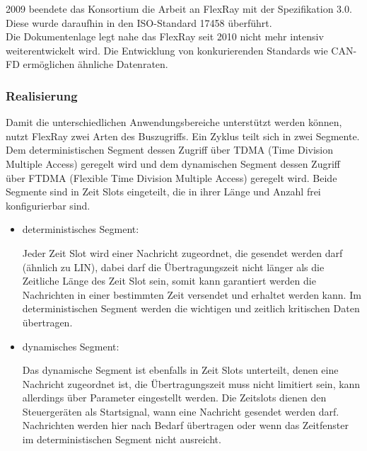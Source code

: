     2009 beendete das Konsortium die Arbeit an FlexRay mit der Spezifikation 3.0. Diese wurde
    daraufhin in den ISO-Standard 17458 überführt.\\
    Die Dokumentenlage legt nahe das FlexRay seit 2010 nicht mehr intensiv weiterentwickelt 
    wird. 
    Die Entwicklung von konkurierenden Standards wie CAN-FD ermöglichen ähnliche Datenraten.
    ~\cite{LA_FR1}
    ~\cite{LA_FR5}
    ~\cite{LA_FR6}

    \subsubsection{Realisierung}

    Damit die unterschiedlichen Anwendungsbereiche unterstützt werden können, nutzt FlexRay
    zwei Arten des Buszugriffs.
    Ein Zyklus teilt sich in zwei Segmente. Dem deterministischen Segment dessen Zugriff über
    TDMA (Time Division Multiple Access) geregelt wird und dem dynamischen Segment dessen 
    Zugriff über FTDMA (Flexible Time Division Multiple Access) geregelt wird.
    Beide Segmente sind in Zeit Slots eingeteilt, die in ihrer Länge und Anzahl frei konfigurierbar sind.\\
    \begin{itemize}
    \item{deterministisches Segment:}
    
    Jeder Zeit Slot wird einer Nachricht zugeordnet, die gesendet werden darf (ähnlich zu LIN), 
    dabei darf die Übertragungszeit nicht länger als die Zeitliche Länge des Zeit Slot sein, somit kann
    garantiert werden die Nachrichten in einer bestimmten Zeit versendet und erhaltet werden
    kann. Im deterministischen Segment werden die wichtigen und zeitlich kritischen Daten
    übertragen. \\
    
    \item{dynamisches Segment:}

    Das dynamische Segment ist ebenfalls in Zeit Slots unterteilt, denen eine Nachricht zugeordnet ist,
    die Übertragungszeit muss nicht limitiert sein, kann allerdings über Parameter eingestellt werden. 
    Die Zeitslots dienen den Steuergeräten als Startsignal, wann eine Nachricht gesendet werden darf. 
    Nachrichten werden hier nach Bedarf übertragen oder wenn das Zeitfenster im deterministischen Segment 
    nicht ausreicht.\\
    \end{itemize}

